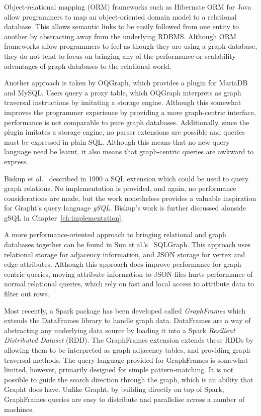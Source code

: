 Object-relational mapping (ORM) frameworks such as Hibernate ORM for Java
allow programmers to map an object-oriented domain model to a relational
database. This allows semantic links to be easily followed from one entity to
another by abstracting away from the underlying RDBMS. Although
ORM frameworks allow programmers to feel as though they are using a graph
database, they do not tend to focus on bringing any of the performance or
scalability advantages of graph databases to the relational world.

Another approach is taken by OQGraph\cite{oqgraph}, which provides a plugin
for  MariaDB and MySQL.  Users query a proxy
table, which OQGraph interprets as graph traversal instructions by imitating a storage engine. Although this
somewhat improves the programmer experience by providing a more graph-centric
interface, performance is not comparable to pure graph databases.
Additionally, since the plugin imitates a  storage engine, no parser
extensions are possible and queries must be expressed in  plain SQL. Although
this means that no new query language need be learnt, it also means that
graph-centric queries are awkward to express.

Biskup et al.~\cite{gSQL} described in 1990 a SQL extension which could be
used to  query graph relations. No implementation is provided, and again, no
performance considerations are made, but the work nonetheless provides a valuable 
inspiration for Grapht's query language \textit{gSQL}. Biskup's work is further discussed alonside gSQL in Chapter~\ref{ch:implementation}.

A more performance-oriented approach to bringing relational and graph
databases together can be found in Sun et
al.'s~\cite{Sun:2015:SER:2723372.2723732} SQLGraph. This approach uses
relational storage for adjacency information, and JSON storage for vertex and
edge attributes. Although this approach does improve performance for graph-centric queries, 
moving attribute information to JSON files hurts performance
of normal relational queries, which rely on fast and local access to attribute data to filter out rows.

Most recently, a Spark package has been developed called \textit{GraphFrames} which extends the
DataFrames library to handle graph data\cite{graphframes}.
DataFrames are a way of abstracting any underlying data source by loading it
into a Spark \textit{Resilient Distributed Dataset} (RDD). The GraphFrames
extension extends these RDDs by allowing them to be interpreted as graph adjacency
tables, and providing graph traversal methods. The query language provided  for GraphFrames is
somewhat limited, however, primarily designed for simple pattern-matching. It is not possible to guide the search direction through the graph, which is an ability that Grapht does have. Unlike Grapht, by building directly on top of Spark, GraphFrames queries
are easy to distribute and parallelise across a number of machines.

